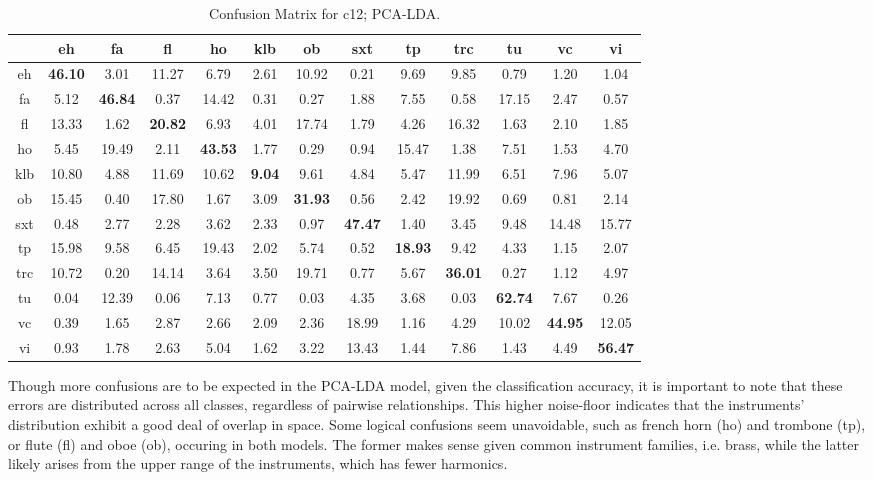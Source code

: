 \begin{landscape}
\begin{table*} %
\begin{center}
\caption{Confusion Matrix for c12; PCA-LDA.}
\begin{tabular}{c | cccccccccccc}
\hline
     &    eh &    fa &   fl &    ho &   klb &    ob &   sxt &    tp &   trc &    tu &    vc &    vi \\
\hline
 eh  & \textbf{46.10} &  3.01 & 11.27 &  6.79 &  2.61 & 10.92 &  0.21 &  9.69 &  9.85 &  0.79 &  1.20 &  1.04 \\
 fa  &  5.12 & \textbf{46.84} &  0.37 & 14.42 &  0.31 &  0.27 &  1.88 &  7.55 &  0.58 & 17.15 &  2.47 &  0.57 \\
 fl & 13.33 &  1.62 & \textbf{20.82} &  6.93 &  4.01 & 17.74 &  1.79 &  4.26 & 16.32 &  1.63 &  2.10 &  1.85 \\
 ho  &  5.45 & 19.49 &  2.11 & \textbf{43.53} &  1.77 &  0.29 &  0.94 & 15.47 &  1.38 &  7.51 &  1.53 &  4.70 \\
 klb & 10.80 &  4.88 & 11.69 & 10.62 &  \textbf{9.04} &  9.61 &  4.84 &  5.47 & 11.99 &  6.51 &  7.96 &  5.07 \\
 ob  & 15.45 &  0.40 & 17.80 &  1.67 &  3.09 & \textbf{31.93} &  0.56 &  2.42 & 19.92 &  0.69 &  0.81 &  2.14 \\
 sxt &  0.48 &  2.77 &  2.28 &  3.62 &  2.33 &  0.97 & \textbf{47.47} &  1.40 &  3.45 &  9.48 & 14.48 & 15.77 \\
 tp  & 15.98 &  9.58 &  6.45 & 19.43 &  2.02 &  5.74 &  0.52 & \textbf{18.93} &  9.42 &  4.33 &  1.15 &  2.07 \\
 trc & 10.72 &  0.20 & 14.14 &  3.64 &  3.50 & 19.71 &  0.77 &  5.67 & \textbf{36.01} &  0.27 &  1.12 &  4.97 \\
 tu  &  0.04 & 12.39 &  0.06 &  7.13 &  0.77 &  0.03 &  4.35 &  3.68 &  0.03 & \textbf{62.74} &  7.67 &  0.26 \\
 vc  &  0.39 &  1.65 &  2.87 &  2.66 &  2.09 &  2.36 & 18.99 &  1.16 &  4.29 & 10.02 & \textbf{44.95} & 12.05 \\
 vi  &  0.93 &  1.78 &  2.63 &  5.04 &  1.62 &  3.22 & 13.43 &  1.44 &  7.86 &  1.43 &  4.49 & \textbf{56.47} \\
\hline
\end{tabular}
\label{tab:confmat_pcalda}
\end{center}
\end{table*}
\end{landscape}

Though more confusions are to be expected in the PCA-LDA model, given the classification accuracy, it is important to note that these errors are distributed across all classes, regardless of pairwise relationships.
This higher noise-floor indicates that the instruments' distribution exhibit a good deal of overlap in space.
Some logical confusions seem unavoidable, such as french horn (ho) and trombone (tp), or flute (fl) and oboe (ob), occuring in both models.
The former makes sense given common instrument families, i.e. brass, while the latter likely arises from the upper range of the instruments, which has fewer harmonics.



